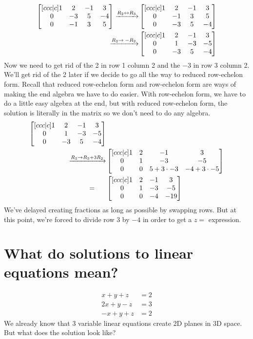 \documentclass[12pt]{scrartcl}
\begin{document}
\begin{align*}
    \begin{bmatrix}[ccc|c]
        1 & 2 & -1 & 3 \\
        0 & -3 & 5 & -4 \\
        0 & -1 & 3 & 5
    \end{bmatrix}
    \xto[R_2 \lrto R_3]&
    \begin{bmatrix}[ccc|c]
        1 & 2 & -1 & 3 \\
        0 & -1 & 3 & 5 \\
        0 & -3 & 5 & -4
    \end{bmatrix} \\
    \xto[R_2 \to \: -R_2]&
    \begin{bmatrix}[ccc|c]
        1 & 2 & -1 & 3 \\
        0 & 1 & -3 & -5 \\
        0 & -3 & 5 & -4
    \end{bmatrix}
\end{align*}
Now we need to get rid of the 2 in row 1 column 2 and the $-3$ in row 3 column 2. We'll get rid of the 2 later if we decide to go all the way to reduced row-echelon form. Recall that reduced row-echelon form and row-echelon form are ways of making the end algebra we have to do easier. With row-echelon form, we have to do a little easy algebra at the end, but with reduced row-echelon form, the solution is literally in the matrix so we don't need to do any algebra.
\begin{align*}
    \begin{bmatrix}[ccc|c]
        1 & 2 & -1 & 3 \\
        0 & 1 & -3 & -5 \\
        0 & -3 & 5 & -4
    \end{bmatrix}&\\
    \xto[R_3 \to R_3 + 3R_2]&
    \begin{bmatrix}[ccc|c]
        1 & 2 & -1 & 3 \\
        0 & 1 & -3 & -5 \\
        0 & 0 & 5 + 3 \cdot -3 & -4 + 3 \cdot -5
    \end{bmatrix} \\
    =\quad\:\:\:&
    \begin{bmatrix}[ccc|c]
        1 & 2 & -1 & 3 \\
        0 & 1 & -3 & -5 \\
        0 & 0 & -4 & -19
    \end{bmatrix}
\end{align*}
We've delayed creating fractions as long as possible by swapping rows. But at this point, we're forced to divide row 3 by $-4$ in order to get a $z =$ expression.



\section*{What do solutions to linear equations mean?}
\begin{align*}
    x + y + z &= 2 \\
    2x + y - z &= 3 \\
    -x + y + z &= 2
\end{align*}
We already know that 3 variable linear equations create 2D planes in 3D space. But what does the solution look like?
\end{document}
